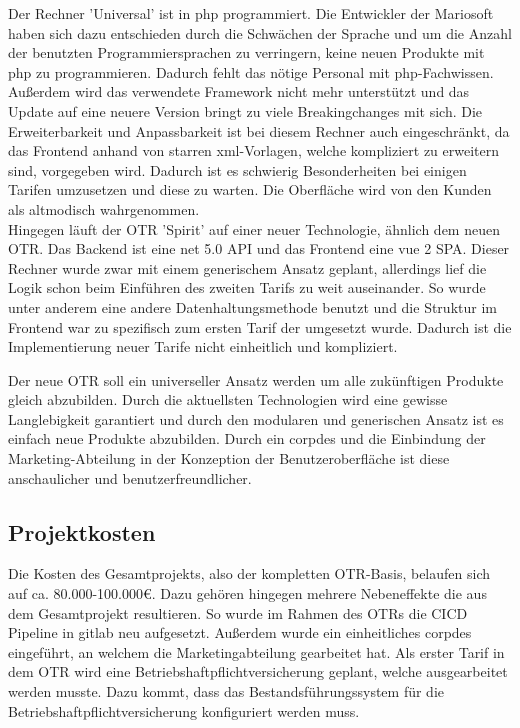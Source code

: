 Der Rechner 'Universal' ist in \gls{php} programmiert. Die Entwickler der Mariosoft haben sich dazu entschieden durch die Schwächen der Sprache und um die Anzahl der benutzten Programmiersprachen zu verringern, keine neuen Produkte mit \gls{php} zu programmieren. Dadurch fehlt das nötige Personal mit \gls{php}-Fachwissen. Außerdem wird das verwendete Framework nicht mehr unterstützt und das Update auf eine neuere Version bringt zu viele Breakingchanges mit sich. Die Erweiterbarkeit und Anpassbarkeit ist bei diesem Rechner auch eingeschränkt, da das Frontend anhand von starren \gls{xml}-Vorlagen, welche kompliziert zu erweitern sind, vorgegeben wird. Dadurch ist es schwierig Besonderheiten bei einigen Tarifen umzusetzen und diese zu warten. Die Oberfläche wird von den Kunden als altmodisch wahrgenommen. \\
Hingegen läuft der \ac{OTR} 'Spirit' auf einer neuer Technologie, ähnlich dem neuen \ac{OTR}. Das Backend ist eine \gls{net} 5.0 API und das Frontend eine \gls{vue} 2 \ac{SPA}. Dieser Rechner wurde zwar mit einem generischem Ansatz geplant, allerdings lief die Logik schon beim Einführen des zweiten Tarifs zu weit auseinander. So wurde unter anderem eine andere Datenhaltungsmethode benutzt und die Struktur im Frontend war zu spezifisch zum ersten Tarif der umgesetzt wurde. Dadurch ist die Implementierung neuer Tarife nicht einheitlich und kompliziert.

Der neue \ac{OTR} soll ein universeller Ansatz werden um alle zukünftigen Produkte gleich abzubilden. Durch die aktuellsten Technologien wird eine gewisse Langlebigkeit garantiert und durch den modularen und generischen Ansatz ist es einfach neue Produkte abzubilden. Durch ein \gls{corpdes} und die Einbindung der Marketing-Abteilung in der Konzeption der Benutzeroberfläche ist diese anschaulicher und benutzerfreundlicher.
\subsection{Projektkosten}
\label{projektkosten}
Die Kosten des Gesamtprojekts, also der kompletten \ac{OTR}-Basis, belaufen sich auf ca. 80.000-100.000€. Dazu gehören hingegen mehrere Nebeneffekte die aus dem Gesamtprojekt resultieren. So wurde im Rahmen des \ac{OTR}s die \ac{CICD} Pipeline in \gls{gitlab} neu aufgesetzt. Außerdem wurde ein einheitliches \gls{corpdes}	eingeführt, an welchem die Marketingabteilung gearbeitet hat. Als erster Tarif in dem \ac{OTR} wird eine Betriebshaftpflichtversicherung geplant, welche ausgearbeitet werden musste. Dazu kommt, dass das Bestandsführungssystem für die Betriebshaftpflichtversicherung konfiguriert werden muss.\\

